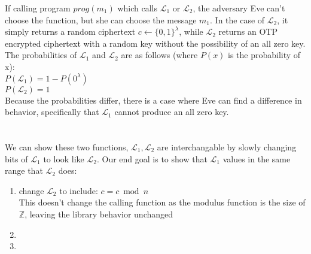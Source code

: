 \documentclass[10pt,letterpaper]{article}
\begin{document}
	If calling program $prog(m_1)$ which calls $\mathcal{L}_1$ or 
	$\mathcal{L}_2$, the adversary Eve can't choose the function, but she
	can choose the message $m_1$. In the case of $\mathcal{L}_2$, it simply
	returns a random ciphertext $c \leftarrow \{0,1\}^\lambda$, while
	$\mathcal{L}_2$ returns an OTP encrypted ciphertext with a random key
	without the possibility of an all zero key. The probabilities of 
	$\mathcal{L}_1$ and $\mathcal{L}_2$ are as follows (where $P(x)$ is the
	probability of x):\\

	\noindent$P(\mathcal{L}_1) = 1-P(0^\lambda)$\\
	$P(\mathcal{L}_2) = 1$\\

	Because the probabilities differ, there is a case where Eve can find a
	difference in behavior, specifically that $\mathcal{L}_1$ cannot
	produce an all zero key. 

\section{}
	We can show these two functions, $\mathcal{L}_1, \mathcal{L}_2$ are 
	interchangable by slowly changing bits of $\mathcal{L}_1$ to look like
	$\mathcal{L}_2$. Our end goal is to show that $\mathcal{L}_1$
	values in the same range that $\mathcal{L}_2$ does:

	\begin{enumerate}
		\item change $\mathcal{L}_2$ to include: $c = c \bmod n$\\
			This doesn't change the calling function as the modulus
			function is the size of $\mathbb{Z}$, leaving the
			library behavior unchanged
		\item 
		\item 
	\end{enumerate}

	

\section{}
\end{document}
